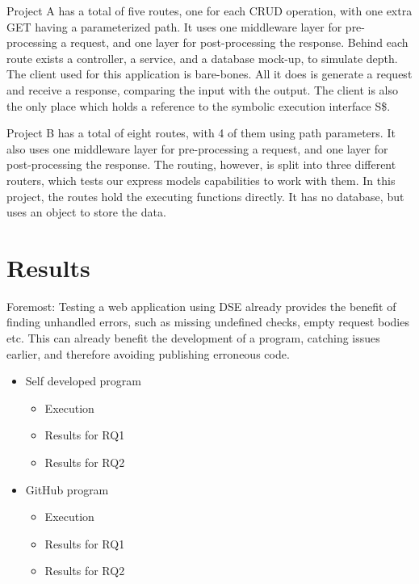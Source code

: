 Project A has a total of five routes, one for each CRUD operation, with one extra GET having a parameterized path.
It uses one middleware layer for pre-processing a request, and one layer for post-processing the response. Behind each route exists a controller, a service, and a database mock-up, to simulate depth. 
The client used for this application is bare-bones. All it does is generate a request and receive a response, comparing the input with the output. The client is also the only place which holds a reference to the symbolic execution interface S\$.

Project B has a total of eight routes, with 4 of them using path parameters.
It also uses one middleware layer for pre-processing a request, and one layer for post-processing the response. The routing, however, is split into three different routers, which tests our express models capabilities to work with them. In this project, the routes hold the executing functions directly. It has no database, but uses an object to store the data. 



\section{Results}
\label{sec:results}
Foremost: Testing a web application using DSE already provides the benefit of finding unhandled errors, such as missing undefined checks, empty request bodies etc. 
This can already benefit the development of a program, catching issues earlier, and therefore avoiding publishing erroneous code.



\begin{itemize}
    \item Self developed program
    \begin{itemize}
        \item Execution
        \item Results for RQ1
        \item Results for RQ2
    \end{itemize}
    \item GitHub program
    \begin{itemize}
        \item Execution
        \item Results for RQ1
        \item Results for RQ2
    \end{itemize}
\end{itemize}

